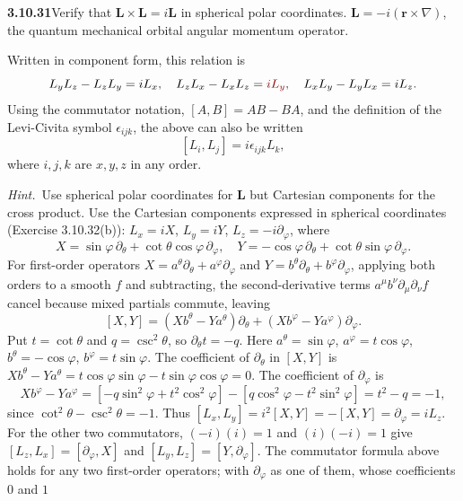 \par\bigskip
\noindent\textbf{3.10.31}\quad Verify that $\mathbf{L}\times\mathbf{L}
=i\mathbf{L}$ in spherical polar coordinates.
$\mathbf{L}=-i(\mathbf{r}\times\nabla)$, the quantum mechanical orbital
angular momentum operator.

Written in component form, this relation is
\[
L_{y}L_{z}-L_{z}L_{y}=iL_{x},\quad L_{z}L_{x}-L_{x}L_{z}=\erratum{iL_{y}},\quad
L_{x}L_{y}-L_{y}L_{x}=iL_{z}.
\]
Using the commutator notation, $[A,B]=AB-BA$, and the definition of the
Levi-Civita symbol $\epsilon_{ijk}$, the above can also be written
\[
[L_{i},L_{j}]=i\epsilon_{ijk}L_{k},
\]
where $i,j,k$ are $x,y,z$ in any order.

\emph{Hint.}~Use spherical polar coordinates for $\mathbf{L}$ but Cartesian
components for the cross product.
\solution
{}
Use the Cartesian components expressed in spherical coordinates
(Exercise 3.10.32(b)):
$L_x=iX$, $L_y=iY$, $L_z=-i\partial_\varphi$, where
\[
X=\sin\varphi\,\partial_\theta+\cot\theta\cos\varphi\,\partial_\varphi,\quad
Y=-\cos\varphi\,\partial_\theta+\cot\theta\sin\varphi\,\partial_\varphi.
\]
For first-order operators $X=a^\theta\partial_\theta+a^\varphi\partial_\varphi$
and $Y=b^\theta\partial_\theta+b^\varphi\partial_\varphi$, applying both
orders to a smooth $f$ and subtracting, the second-derivative terms
$a^\mu b^\nu\partial_\mu\partial_\nu f$ cancel because mixed partials
commute, leaving
\[
[X,Y]=(Xb^\theta-Ya^\theta)\partial_\theta+(Xb^\varphi-Ya^\varphi)\partial_\varphi .
\]
Put $t=\cot\theta$ and $q=\csc^2\theta$, so $\partial_\theta t=-q$.
Here $a^\theta=\sin\varphi$, $a^\varphi=t\cos\varphi$,
$b^\theta=-\cos\varphi$, $b^\varphi=t\sin\varphi$.
The coefficient of $\partial_\theta$ in $[X,Y]$ is
$Xb^\theta-Ya^\theta=t\cos\varphi\sin\varphi-t\sin\varphi\cos\varphi=0$.
The coefficient of $\partial_\varphi$ is
\[
Xb^\varphi-Ya^\varphi=[-q\sin^2\varphi+t^2\cos^2\varphi]
-[q\cos^2\varphi-t^2\sin^2\varphi]
=t^2-q=-1,
\]
since $\cot^2\theta-\csc^2\theta=-1$.
Thus $[L_x,L_y]=i^2[X,Y]=-[X,Y]=\partial_\varphi=iL_z$.
For the other two commutators, $(-i)(i)=1$ and $(i)(-i)=1$ give
$[L_z,L_x]=[\partial_\varphi,X]$ and $[L_y,L_z]=[Y,\partial_\varphi]$.
The commutator formula above holds for any two first-order operators;
with $\partial_\varphi$ as one of them, whose coefficients $0$ and $1$
